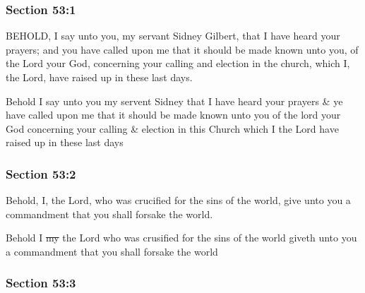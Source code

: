 	\subsubsection{Section 53:1} %
		\label{DC53-1}

		BEHOLD, I say unto you, my servant Sidney Gilbert, that I have heard your prayers; and you have called upon me that it should be made known unto you, of the Lord your God, concerning your calling and election in the church, which I, the Lord, have raised up in these last days.

		\begin{framed}
		\scriptsize
			\begin{compactdesc}
				\item[JSP] Behold I say unto you my servent Sidney that I have heard your prayers \& ye have called upon me that it should be made known unto you of the lord your God concerning your calling \& election in this Church which I the Lord have raised up in these last days
			\end{compactdesc}
		\end{framed}

	\subsubsection{Section 53:2} %
		\label{DC53-2}

		Behold, I, the Lord, who was crucified for the sins of the world, give unto you a commandment that you shall forsake the world.

		\begin{framed}
		\scriptsize
			\begin{compactdesc}
				\item[JSP] Behold I \sout{my} the Lord who was crusified for the sins of the world giveth unto you a commandment that you shall forsake the world
			\end{compactdesc}
		\end{framed}

	\subsubsection{Section 53:3} %
		\label{DC53-3}

